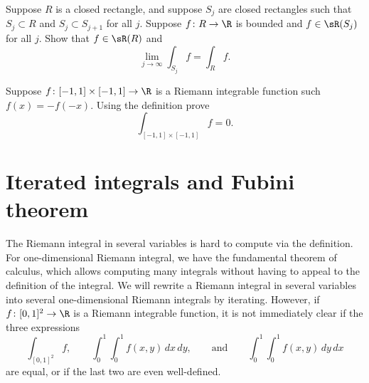\begin{exercise}
Suppose $R$ is a closed rectangle, and suppose $S_j$ are closed rectangles
such that $S_j \subset R$ and $S_j \subset S_{j+1}$ for all $j$.
Suppose $f \colon R \to \R$ is bounded and $f \in \sR(S_j)$ for all $j$.
Show that $f \in \sR(R)$ and
\begin{equation*}
\lim_{j\to\infty} \int_{S_j} f = \int_R f .
\end{equation*}
\end{exercise}

\begin{exercise}
Suppose $f\colon [-1,1] \times [-1,1] \to \R$ is a Riemann
integrable function such $f(x) = -f(-x)$.  Using the definition prove
\begin{equation*}
\int_{[-1,1] \times [-1,1]} f = 0 .
\end{equation*}
\end{exercise}


\sectionnewpage
\section{Iterated integrals and Fubini theorem}
\label{sec:iteratedints}


The Riemann integral in several variables
is hard to compute via the definition.
For one-dimensional Riemann integral, we have the fundamental
theorem of calculus,
which allows computing many integrals without
having to appeal to the definition of the integral.
We will rewrite 
a Riemann integral in several variables into
several one-dimensional Riemann integrals
by iterating.  However, if $f \colon [0,1]^2 \to \R$ is a Riemann integrable
function, it is not immediately clear if the three expressions
\begin{equation*}
\int_{[0,1]^2} f ,
\qquad
\int_0^1 \int_0^1 f(x,y) \, dx \, dy ,
\qquad \text{and}
\qquad
\int_0^1 \int_0^1 f(x,y) \, dy \, dx
\end{equation*}
are equal, or if the last two are even well-defined.

